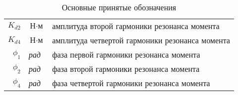 \begin{table}[ht!]
\begin{tabular}{rll}
    $K_{d2}$             & $\textit{Н} \cdot \textit{м}$ & амплитуда второй гармоники резонанса момента \\

    $K_{d4}$             & $\textit{Н} \cdot \textit{м}$ & амплитуда четвертой гармоники резонанса момента \\

    $\phi_{1}$           & \textit{рад} & фаза первой гармоники резонанса момента \\

    $\phi_{2}$           & \textit{рад} & фаза второй гармоники резонанса момента \\

    $\phi_{4}$           & \textit{рад} & фаза четвертой гармоники резонанса момента \\

    \end{tabular}
    \caption{ Основные принятые обозначения }
\end{table}

